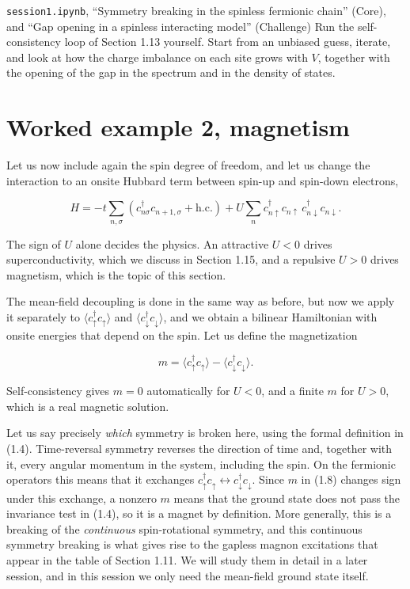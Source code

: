 

\begin{notebookbox}{\texttt{session1.ipynb}, ``Symmetry breaking in the spinless fermionic chain'' (Core), and ``Gap opening in a spinless interacting model'' (Challenge)}
Run the self-consistency loop of Section 1.13 yourself. Start from an unbiased guess, iterate, and
look at how the charge imbalance on each site grows with $V$, together with the opening of the gap
in the spectrum and in the density of states.
\end{notebookbox}

\section{Worked example 2, magnetism}

Let us now include again the spin degree of freedom, and let us change the interaction to an onsite
Hubbard term between spin-up and spin-down electrons,

\begin{equation}
H = -t\sum_{n,\sigma}\left(c_{n\sigma}^\dagger c_{n+1,\sigma} + \text{h.c.}\right) + U\sum_n c_{n\uparrow}^\dagger c_{n\uparrow}\, c_{n\downarrow}^\dagger c_{n\downarrow}.
\end{equation}

The sign of $U$ alone decides the physics. An attractive $U<0$ drives superconductivity, which we
discuss in Section 1.15, and a repulsive $U>0$ drives magnetism, which is the topic of this section.

The mean-field decoupling is done in the same way as before, but now we apply it separately to
$\langle c_{\uparrow}^\dagger c_\uparrow\rangle$ and $\langle c_\downarrow^\dagger
c_\downarrow\rangle$, and we obtain a bilinear Hamiltonian with onsite energies that depend on the
spin. Let us define the magnetization

\begin{equation}
m = \langle c_\uparrow^\dagger c_\uparrow\rangle - \langle c_\downarrow^\dagger c_\downarrow\rangle.
\end{equation}

Self-consistency gives $m=0$ automatically for $U<0$, and a finite $m$ for $U>0$, which is a real
magnetic solution.

Let us say precisely \emph{which} symmetry is broken here, using the formal definition in (1.4).
Time-reversal symmetry reverses the direction of time and, together with it, every angular momentum
in the system, including the spin. On the fermionic operators this means that it exchanges
$c_\uparrow^\dagger c_\uparrow \leftrightarrow c_\downarrow^\dagger c_\downarrow$. Since $m$ in
(1.8) changes sign under this exchange, a nonzero $m$ means that the ground state does not pass the
invariance test in (1.4), so it is a magnet by definition. More generally, this is a breaking of the
\emph{continuous} spin-rotational symmetry, and this continuous symmetry breaking is what gives rise
to the gapless magnon excitations that appear in the table of Section 1.11. We will study them in
detail in a later session, and in this session we only need the mean-field ground state itself.

